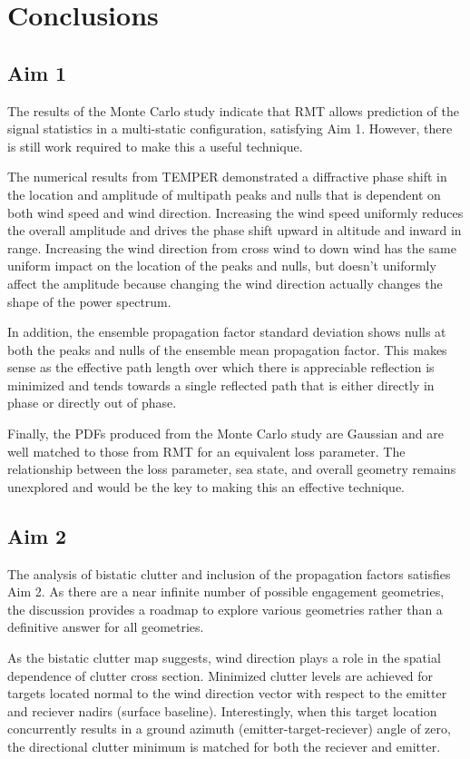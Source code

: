 \renewcommand{\baselinestretch}{2} \small\normalsize
\section{Conclusions}

\subsection{Aim 1}
The results of the Monte Carlo study indicate that RMT allows prediction of the signal statistics in a multi-static configuration, satisfying Aim 1. However, there is still work required to make this a useful technique. 

The numerical results from TEMPER demonstrated a diffractive phase shift in the location and amplitude of multipath peaks and nulls that is dependent on both wind speed and wind direction. Increasing the wind speed uniformly reduces the overall amplitude and drives the phase shift upward in altitude and inward in range. Increasing the wind direction from cross wind to down wind has the same uniform impact on the location of the peaks and nulls, but doesn't uniformly affect the amplitude because changing the wind direction actually changes the shape of the power spectrum.

In addition, the ensemble propagation factor standard deviation shows nulls at both the peaks and nulls of the ensemble mean propagation factor. This makes sense as the effective path length over which there is appreciable reflection is minimized and tends towards a single reflected path that is either directly in phase or directly out of phase.

Finally, the PDFs produced from the Monte Carlo study are Gaussian and are well matched to those from RMT for an equivalent loss parameter. The relationship between the loss parameter, sea state, and overall geometry remains unexplored and would be the key to making this an effective technique. 

\subsection{Aim 2}
The analysis of bistatic clutter and inclusion of the propagation factors satisfies Aim 2. As there are a near infinite number of possible engagement geometries, the discussion provides a roadmap to explore various geometries rather than a definitive answer for all geometries.

As the bistatic clutter map suggests, wind direction plays a role in the spatial dependence of clutter cross section. Minimized clutter levels are achieved for targets located normal to the wind direction vector with respect to the emitter and reciever nadirs (surface baseline). Interestingly, when this target location concurrently results in a ground azimuth (emitter-target-reciever) angle of zero, the directional clutter minimum is matched for both the reciever and emitter.